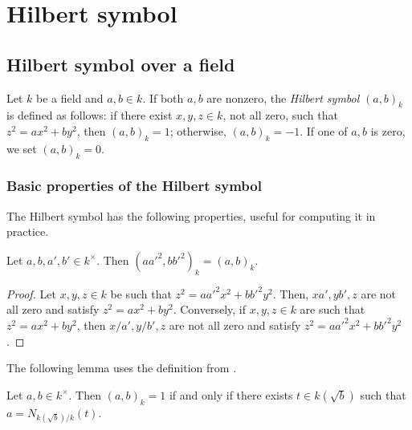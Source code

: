 \chapter{Hilbert symbol}

\section{Hilbert symbol over a field}

\begin{definition}
	\label{def:Hilbert_symbol}
	\leanok
	Let $k$ be a field and $a, b \in k$. If both $a,b$ are nonzero, the \emph{Hilbert symbol} $(a, b)_k$ is defined as
	follows: if there exist $x, y, z \in k$, not all zero, such that $z^2 = ax^2 + by^2$,
	then $(a, b)_k = 1$; otherwise, $(a, b)_k = -1$. If one of $a,b$ is zero, we set $(a, b)_k = 0$.
\end{definition}


\subsection{Basic properties of the Hilbert symbol}

The Hilbert symbol has the following properties, useful for computing it in practice.

\begin{lemma}
	\label{lem:well_defined_up_to_squares}
	\leanok
Let $a, b, a', b' \in k^\times$. Then $(a a'^2, b b'^2)_k = (a,b)_k$.
\end{lemma}

\begin{proof}
\leanok
	Let $x, y, z \in k$ be such that $z^2 = a a'^2 x^2 + b b'^2 y^2$. Then, $xa', yb', z$ are not all
	zero and satisfy $z^2 = ax^2 + by^2$. Conversely, if $x, y, z \in k$ are such that
	$z^2 = ax^2 + by^2$, then $x/a', y/b', z$ are not all zero and satisfy
	$z^2 = a a'^2 x^2 + b b'^2 y^2$.
\end{proof}

The following lemma uses the definition  from \mathlib.

\begin{lemma}
	\label{lem:eq_one_iff}
	\leanok
	Let $a, b \in k^\times$. Then $(a, b)_k = 1$ if and only if there exists $t \in k(\sqrt{b})$ such
	that $a = N_{k(\sqrt{b})/k}(t)$.
\end{lemma}


